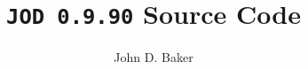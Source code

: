 %
%



\author{John D. Baker}
\title{\texttt{JOD 0.9.90} Source Code}

\setlength{\columnsep}{3em}
\setlength{\columnseprule}{0.5pt}
\twocolumn

\maketitle
\tableofcontents
\onecolumn

\newpage


\newpage


\newpage


\newpage


\newpage


\newpage


%

\newpage
{}
{}
\printindex


